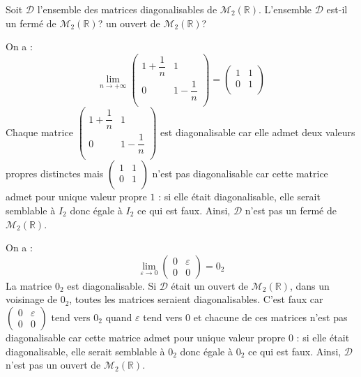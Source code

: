\documentclass[a4paper,10pt]{report}
\begin{document}
\begin{Exercice}{} Soit $\mathcal{D}$ l'ensemble des matrices diagonalisables de $\mathcal{M}_2(\mathbb{R})$. L'ensemble $\mathcal{D}$ est-il un fermé de $\mathcal{M}_2(\mathbb{R})$? un ouvert de $\mathcal{M}_2(\mathbb{R})$?
\end{Exercice}

\corr On a :
$$ \lim_{n \rightarrow + \infty} \begin{pmatrix}
1+ \dfrac{1}{n} & 1 \\
0 & 1- \dfrac{1}{n} \\
\end{pmatrix} = \begin{pmatrix}
1 & 1 \\
0 & 1 \\
\end{pmatrix}$$
Chaque matrice $\begin{pmatrix}
1+ \dfrac{1}{n} & 1 \\
0 & 1- \dfrac{1}{n} \\
\end{pmatrix}$ est diagonalisable car elle admet deux valeurs propres distinctes mais $\begin{pmatrix}
1 & 1 \\
0 & 1 \\
\end{pmatrix}$ n'est pas diagonalisable car cette matrice admet pour unique valeur propre $1$ : si elle était diagonalisable, elle serait semblable à $I_2$ donc égale à $I_2$ ce qui est faux. Ainsi, $\mathcal{D}$ n'est pas un fermé de $\mathcal{M}_2(\mathbb{R})$.

\medskip

\noindent On a : 
$$ \lim_{\varepsilon \rightarrow 0} \begin{pmatrix}
0 & \varepsilon \\
0 & 0 
\end{pmatrix} = 0_2$$
La matrice $0_2$ est diagonalisable. Si $\mathcal{D}$ était un ouvert de $\mathcal{M}_2(\mathbb{R})$, dans un voisinage de $0_2$, toutes les matrices seraient diagonalisables. C'est faux car $\begin{pmatrix}
0 & \varepsilon \\
0 & 0 
\end{pmatrix}$ tend vers $0_2$ quand $\varepsilon$ tend vers $0$ et chacune de ces matrices n'est pas diagonalisable car cette matrice admet pour unique valeur propre $0$ : si elle était diagonalisable, elle serait semblable à $0_2$ donc égale à $0_2$ ce qui est faux. Ainsi, $\mathcal{D}$ n'est pas un ouvert de $\mathcal{M}_2(\mathbb{R})$.
\end{document}
